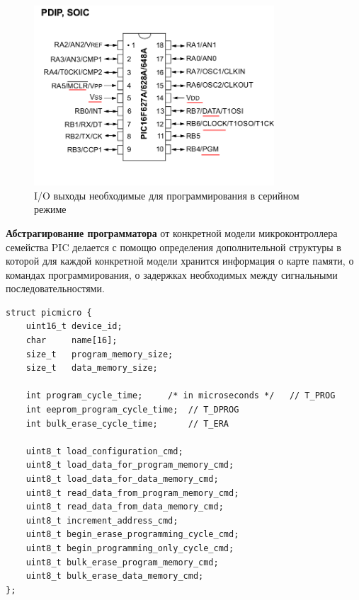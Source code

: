 \begin{figure}[h!]
    \centering
    \includegraphics[width=0.8\textwidth]{2017-05-07_at_22:31:52_screenshot.png}
    \caption{I/O выходы необходимые для программирования в серийном режиме}
\end{figure}


\textbf{Абстрагирование программатора} от конкретной модели микроконтроллера семейства PIC 
делается с помощю определения дополнительной структуры в которой для каждой конкретной модели 
хранится информация о карте памяти, о командах программирования, о задержках необходимых между 
сигнальными последовательностями.

\begin{small}
\begin{verbatim}
struct picmicro {
    uint16_t device_id;
    char     name[16];
    size_t   program_memory_size;
    size_t   data_memory_size;

    int program_cycle_time;     /* in microseconds */   // T_PROG
    int eeprom_program_cycle_time;  // T_DPROG
    int bulk_erase_cycle_time;      // T_ERA

    uint8_t load_configuration_cmd;
    uint8_t load_data_for_program_memory_cmd;
    uint8_t load_data_for_data_memory_cmd;
    uint8_t read_data_from_program_memory_cmd;
    uint8_t read_data_from_data_memory_cmd;
    uint8_t increment_address_cmd;
    uint8_t begin_erase_programming_cycle_cmd;
    uint8_t begin_programming_only_cycle_cmd;
    uint8_t bulk_erase_program_memory_cmd;
    uint8_t bulk_erase_data_memory_cmd;
};
\end{verbatim}
\end{small}

